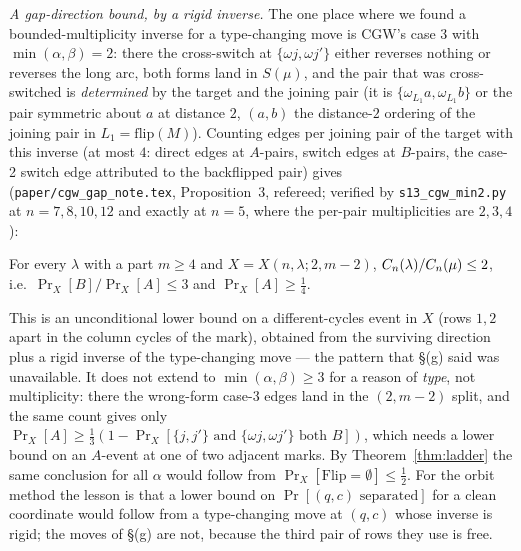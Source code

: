 \emph{A gap-direction bound, by a rigid inverse.}  The one place where
we found a bounded-multiplicity inverse for a type-changing move is
CGW's case 3 with $\min(\alpha,\beta)=2$: there the cross-switch at
$\{\omega j,\omega j'\}$ either reverses nothing or reverses the long
arc, both forms land in $S(\mu)$, and the pair that was cross-switched
is \emph{determined} by the target and the joining pair (it is
$\{\omega_{L_1}a,\omega_{L_1}b\}$ or the pair symmetric about $a$ at
distance $2$, $(a,b)$ the distance-$2$ ordering of the joining pair in
$L_1=\mathrm{flip}(M)$).  Counting edges per joining pair of the target
with this inverse (at most $4$: direct edges at $A$-pairs, switch edges
at $B$-pairs, the case-2 switch edge attributed to the backflipped
pair) gives (\texttt{paper/cgw\_gap\_note.tex}, Proposition~3,
refereed; verified by \texttt{s13\_cgw\_min2.py} at $n=7,8,10,12$ and
exactly at $n=5$, where the per-pair multiplicities are $2,3,4$):
\begin{proposition}\label{prop:alpha2}
For every $\lambda$ with a part $m\ge4$ and $X=X(n,\lambda;2,m-2)$,
$C_n(\lambda)/C_n(\mu)\le2$, i.e.\ $\Pr_X[B]/\Pr_X[A]\le3$ and
$\Pr_X[A]\ge\tfrac14$.
\end{proposition}
\noindent This is an unconditional lower bound on a different-cycles
event in $X$ (rows $1,2$ apart in the column cycles of the mark),
obtained from the surviving direction plus a rigid inverse of the
type-changing move --- the pattern that \S(g) said was unavailable.
It does not extend to $\min(\alpha,\beta)\ge3$ for a reason of
\emph{type}, not multiplicity: there the wrong-form case-3 edges land
in the $(2,m-2)$ split, and the same count gives only
$\Pr_X[A]\ge\tfrac13(1-\Pr_X[\{j,j'\}\text{ and }\{\omega j,\omega j'\}\text{ both }B])$,
which needs a lower bound on an $A$-event at one of two adjacent
marks.  By Theorem~\ref{thm:ladder} the same conclusion for all
$\alpha$ would follow from $\Pr_X[\mathrm{Flip}=\emptyset]\le\tfrac12$.
For the orbit method the lesson is that a lower bound on
$\Pr[(q,c)\text{ separated}]$ for a clean coordinate would follow from
a type-changing move at $(q,c)$ whose inverse is rigid; the moves of
\S(g) are not, because the third pair of rows they use is free.

